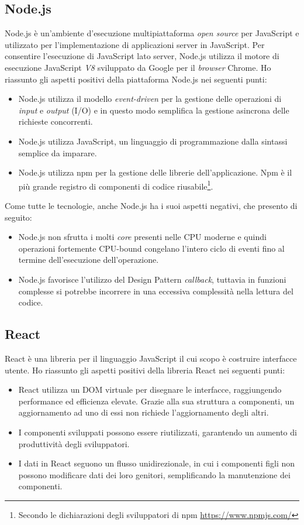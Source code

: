 \subsection{Node.js}

Node.js è un'ambiente d'esecuzione multipiattaforma \emph{open source} per JavaScript e utilizzato per l'implementazione di applicazioni server in JavaScript.
Per consentire l'esecuzione di JavaScript lato server, Node.js utilizza il motore di esecuzione JavaScript \emph{V8} sviluppato da \gls{Google} per il \emph{browser} Chrome.
Ho riassunto gli aspetti positivi della piattaforma Node.js nei seguenti punti:
\begin{itemize}
  \item Node.js utilizza il modello \emph{event-driven} per la gestione delle operazioni di \emph{input} e \emph{output} (I/O) e in questo modo semplifica la gestione asincrona delle richieste concorrenti.
  \item Node.js utilizza JavaScript, un linguaggio di programmazione dalla sintassi semplice da imparare.
  \item Node.js utilizza npm per la gestione delle librerie dell'applicazione. Npm è il più grande registro di componenti di codice riusabile\footnote{Secondo le dichiarazioni degli sviluppatori di npm \url{https://www.npmjs.com/}}.
\end{itemize}

Come tutte le tecnologie, anche Node.js ha i suoi aspetti negativi, che presento di seguito:
\begin{itemize}
  \item Node.js non sfrutta i molti \emph{core} presenti nelle CPU moderne e quindi operazioni fortemente \gls{CPU-bound} congelano l'intero ciclo di eventi fino al termine dell'esecuzione dell'operazione.
  \item Node.js favorisce l'utilizzo del Design Pattern \emph{callback}, tuttavia in funzioni complesse si potrebbe incorrere in una eccessiva complessità nella lettura del codice.
\end{itemize}

\subsection{React}

React è una libreria per il linguaggio JavaScript il cui scopo è costruire interfacce utente.
Ho riassunto gli aspetti positivi della libreria React nei seguenti punti:
\begin{itemize}
	\item React utilizza un \gls{DOM} virtuale per disegnare le interfacce, raggiungendo performance ed efficienza elevate. Grazie alla sua struttura a componenti, un aggiornamento ad uno di essi non richiede l'aggiornamento degli altri.
	\item I componenti sviluppati possono essere riutilizzati, garantendo un aumento di produttività degli sviluppatori.
	\item I dati in React seguono un flusso unidirezionale, in cui i componenti figli non possono modificare dati dei loro genitori, semplificando la manutenzione dei componenti.
\end{itemize}

